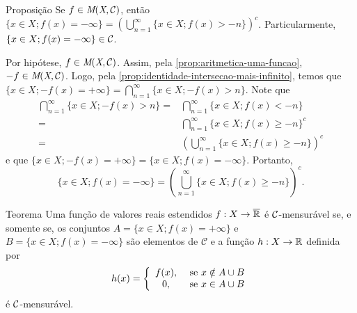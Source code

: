     \begin{env}{Proposição}
    \label{prop:identidade-união-menos-infinito}
        Se $f \in \operatorname{\textit{M}(\textit{X}, \mathcal{C} )}$, então $\{x \in X; f(x) = -\infty\} = \displaystyle \left(\bigcup_{n = 1}^\infty \{x \in X; f(x) > - n\}\right)^c$.
        Particularmente, $\{x \in X; f(x) = -\infty\} \in \operatorname{\mathcal{C}}$.
        \vspace{-0.4cm}
    \end{env}
    \begin{prova}
    	Por hipótese, $f \in \operatorname{\textit{M}(\textit{X}, \mathcal{C} )}$.
    	Assim, pela \ref{prop:aritmetica-uma-funcao}, 
    	$-f \in \operatorname{\textit{M}(\textit{X}, \mathcal{C} )}$.
    	Logo, pela \ref{prop:identidade-intersecao-mais-infinito}, temos que 
    	$\{x \in X; -f(x) = +\infty\} = \displaystyle \bigcap_{n = 1}^\infty \{x \in X; -f(x) > n\}$.
    	Note que 
        \begin{align*}
            \bigcap_{n = 1}^\infty \{x \in X; -f(x) > n\}
            =& \bigcap_{n = 1}^\infty \{x \in X; f(x) < -n\}\\
            =& \bigcap_{n = 1}^\infty \{x \in X; f(x) \geq -n\}^c\\
            =& \left(\bigcup_{n = 1}^\infty \{x \in X; f(x) \geq -n\}\right)^c 
        \end{align*}
    	e que $\{x \in X; -f(x) = +\infty\} = \{x \in X; f(x) = -\infty\}$. Portanto, 
    	$$
    	\{x \in X; f(x) = -\infty\} 
    	= 
    	\displaystyle \left(\bigcup_{n = 1}^\infty \{x \in X; f(x) \geq -n\}\right)^c.$$
    \end{prova}
    \begin{env}{Teorema}
    \label{teo:condição-de-mensurabilidade}
        Uma função de valores reais estendidos $f: X \to \operatorname{\overline{\mathbb{R}}}$ é $\operatorname{\mathcal{C}}$-mensurável se, e somente se, os conjuntos 
        $A = \{ x \in X; f(x) = +\infty\}$ e $B = \{x \in X; f(x) = -\infty\}$
		 são elementos de $\mathcal{C}$ e a função $h: X \to \mathbb{R}$ definida por
		 \vspace{-0.2cm}
		 $$
		 h(x) = \left\{\begin{array}{cc}
		     f(x), & \textrm{\ se } x \notin A\cup B  \\
		      0,& \textrm{\ se } x \in A\cup B
		 \end{array}\right.
	 	 \vspace{-0.2cm}
		 $$
		 é $\operatorname{\mathcal{C}}$-mensurável.
		 \vspace{-0.2cm}
	 \end{env}

